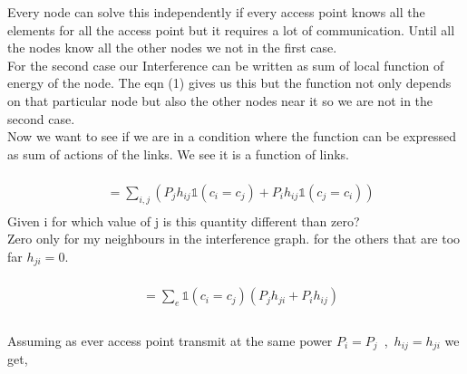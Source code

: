 Every node can solve this independently if every access point knows all the elements for all the access point but it requires a lot of communication.  
Until all the nodes know all the other nodes we not in the first case.\\
For the second case our Interference can be written as sum of local function of energy of the node. 
The eqn (1) gives us this but the function not only depends on that particular node but also the other nodes near it so we are not in the second case.\\
Now we want to see if we are in a condition where the function can be expressed as sum of actions of the links. We see it is a function of links. 
\\ \\
\begin{equation}
\begin{aligned}
& = \sum _{i,j} (P_j h_{ij} \mathds{1} (c_i = c_j ) + P_i h_{ij} \mathds{1} (c_j = c_i))\\ 
\end{aligned}
\end{equation}
Given i for which value of j is this quantity different than zero?\\
Zero only for my neighbours in the interference graph. for the others that are too far $h_{ji} = 0$. \\ \\
\begin{equation}
\begin{aligned}
& = \sum_{e} \mathds{1} (c_i = c_j) (P_j h_{ji} + P_i h_{ij}) \\ 
 \end{aligned}
\end{equation}
\\
Assuming as ever access point transmit at the same power $P_i = P_j $\, ,\,  $h_{ij}=h_{ji}$ we get,\\ 

